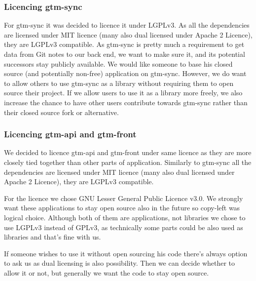 \subsubsection{Licencing gtm-sync}\label{subsubsec:licencing-gtm-sync}
For gtm-sync it was decided to licence it under LGPLv3.
As all the dependencies are licensed under MIT licence (many also dual licensed under Apache 2 Licence), they are LGPLv3 compatible.
As gtm-sync is pretty much a requirement to get data from Git notes to our back end, we want to make sure it,
and its potential successors stay publicly available.
We would like someone to base his closed source (and potentially non-free) application on gtm-sync.
However, we do want to allow others to use gtm-sync as a library without requiring them to open source their project.
If we allow users to use it as a library more freely, we also increase the chance to have other users contribute towards gtm-sync
rather than their closed source fork or alternative.

\subsubsection{Licencing gtm-api and gtm-front}\label{subsubsec:licencing-gtm-api-and-gtm-front}
We decided to licence gtm-api and gtm-front under same licence as they are more closely tied together than other parts of application.
Similarly to gtm-sync all the dependencies are licensed under MIT licence (many also dual licensed under Apache 2 Licence), they are LGPLv3 compatible.

For the licence we chose GNU Lesser General Public Licence v3.0.
We strongly want these applications to stay open source also in the future so copy-left was logical choice.
Although both of them are applications, not libraries we chose to use LGPLv3 instead of GPLv3, as technically some parts
could be also used as libraries and that's fine with us.

If someone wishes to use it without open sourcing his code there's always option to ask us as dual licensing is also possibility.
Then we can decide whether to allow it or not, but generally we want the code to stay open source.
